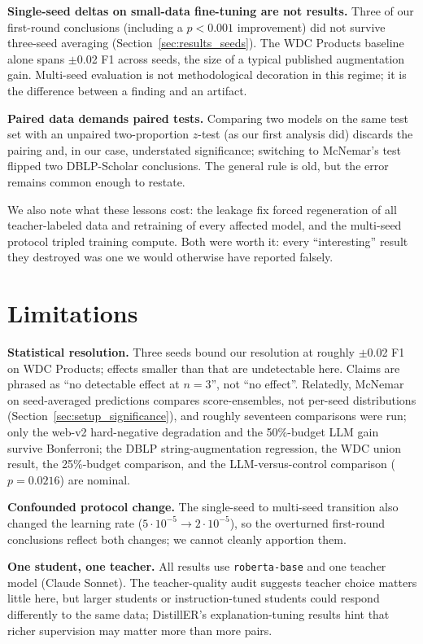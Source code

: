 \documentclass[a4paper,oneside,bibliography=totoc]{scrbook}
\begin{document}
\textbf{Single-seed deltas on small-data fine-tuning are not results.} Three of our first-round conclusions (including a $p < 0.001$ improvement) did not survive three-seed averaging (Section~\ref{sec:results_seeds}). The WDC Products baseline alone spans $\pm$0.02 F1 across seeds, the size of a typical published augmentation gain. Multi-seed evaluation is not methodological decoration in this regime; it is the difference between a finding and an artifact.

\textbf{Paired data demands paired tests.} Comparing two models on the same test set with an unpaired two-proportion $z$-test (as our first analysis did) discards the pairing and, in our case, understated significance; switching to McNemar's test flipped two DBLP-Scholar conclusions. The general rule \cite{dietterich1998approximate} is old, but the error remains common enough to restate.

We also note what these lessons cost: the leakage fix forced regeneration of all teacher-labeled data and retraining of every affected model, and the multi-seed protocol tripled training compute. Both were worth it: every ``interesting'' result they destroyed was one we would otherwise have reported falsely.

\section{Limitations}
\label{sec:disc_limitations}

\textbf{Statistical resolution.} Three seeds bound our resolution at roughly $\pm$0.02 F1 on WDC Products; effects smaller than that are undetectable here. Claims are phrased as ``no detectable effect at $n{=}3$'', not ``no effect''. Relatedly, McNemar on seed-averaged predictions compares score-ensembles, not per-seed distributions (Section~\ref{sec:setup_significance}), and roughly seventeen comparisons were run; only the web-v2 hard-negative degradation and the 50\%-budget LLM gain survive Bonferroni; the DBLP string-augmentation regression, the WDC union result, the 25\%-budget comparison, and the LLM-versus-control comparison ($p = 0.0216$) are nominal.

\textbf{Confounded protocol change.} The single-seed to multi-seed transition also changed the learning rate ($5 \cdot 10^{-5} \rightarrow 2 \cdot 10^{-5}$), so the overturned first-round conclusions reflect both changes; we cannot cleanly apportion them.

\textbf{One student, one teacher.} All results use \texttt{roberta-base} and one teacher model (Claude Sonnet). The teacher-quality audit suggests teacher choice matters little here, but larger students or instruction-tuned students could respond differently to the same data; DistillER's explanation-tuning results hint that richer supervision may matter more than more pairs.
\end{document}
